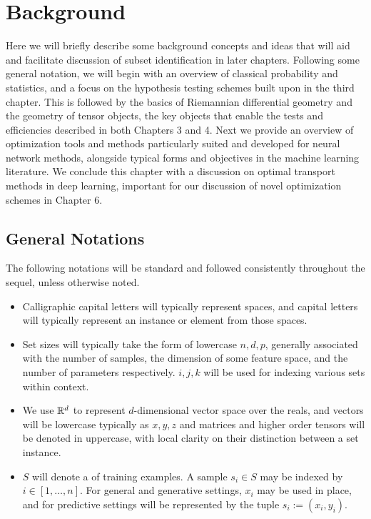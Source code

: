 \chapter{Background}\label{chap:bknd}

Here we will briefly describe some background concepts and ideas that will aid and facilitate discussion of subset identification in later chapters. 
Following some general notation,
we will begin with an overview
of classical probability and statistics,
and a focus on the hypothesis testing
schemes built upon in the third chapter.
This is followed by the basics of Riemannian differential geometry
and the geometry of tensor objects,
the key objects that enable the 
tests and efficiencies described in both 
Chapters 3 and 4.
Next we provide
an overview of optimization tools
and methods particularly suited
and developed for neural network methods,
alongside typical forms and objectives 
in the machine learning literature.
We conclude this chapter
with a discussion on optimal transport
methods in deep learning, important
for our discussion of novel optimization schemes
in Chapter 6.

\section{General Notations}
The following notations will be standard and followed consistently throughout the sequel, unless otherwise noted.
\begin{itemize}
\item Calligraphic capital letters will typically represent spaces, and capital letters will typically represent an instance or element from those spaces.

\item Set sizes will typically take the form of lowercase $n,d,p$, generally associated with the number of samples, the dimension of some feature space, and the number of parameters respectively. $i,j,k$ will be used for indexing various sets within context.

\item We use $\mathbb{R}^d$ to represent $d$-dimensional vector space over the reals, and vectors will be lowercase typically as $x,y,z$ and matrices and higher order tensors will be denoted in uppercase, with local clarity on their distinction between a set instance.

\item $S$ will denote a of training examples.
A sample $s_i\in S$ may be indexed by $i \in [1,\ldots,n]$. 
For general and generative settings, $x_i$ may be used in place, and for predictive settings will be represented by the tuple $s_i:=(x_i,y_i)$.

\end{itemize}


